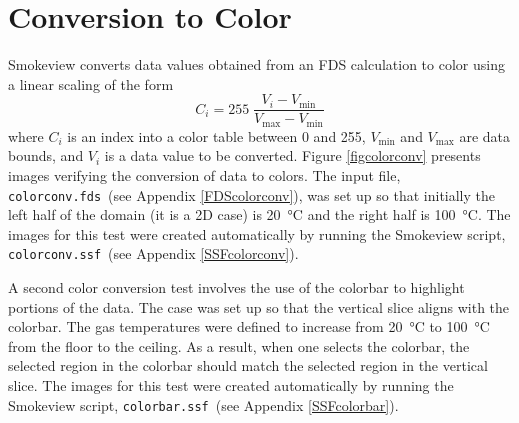 \documentclass[11pt,twoside]{book}
\begin{document}
\section{Conversion to Color}

Smokeview converts data values obtained from an FDS calculation to color using a linear scaling of the form
\begin{equation}
C_i=255 \; \frac{V_i-V_{\min}}{V_{\max}-V_{\min}}
\end{equation}
where $C_i$ is an index into a color table between 0 and 255, $V_{\min}$ and $V_{\max}$  are data bounds, and $V_i$ is a data value to be converted. Figure \ref{figcolorconv} presents images verifying the conversion of data to colors. The input file, {\tt colorconv.fds}\ (see Appendix \ref{FDScolorconv}), was set up so that initially the left half of the domain (it is a 2D case) is \SI{20}{\degreeCelsius} and the right half is \SI{100}{\degreeCelsius}. The images for this test were created automatically by running the Smokeview script, {\tt colorconv.ssf}\ (see Appendix \ref{SSFcolorconv}).

A second color conversion test involves the use of the colorbar to highlight portions of the data.  The case was set up so that the vertical slice aligns with the colorbar.  The gas temperatures were defined to increase from \SI{20}{\degreeCelsius} to \SI{100}{\degreeCelsius} from the floor to the ceiling.  As a result, when one selects the colorbar, the selected region in the colorbar should match the selected region in the vertical slice. The images for this test were created automatically by running the Smokeview script, {\tt colorbar.ssf}\ (see Appendix \ref{SSFcolorbar}).
\end{document}
